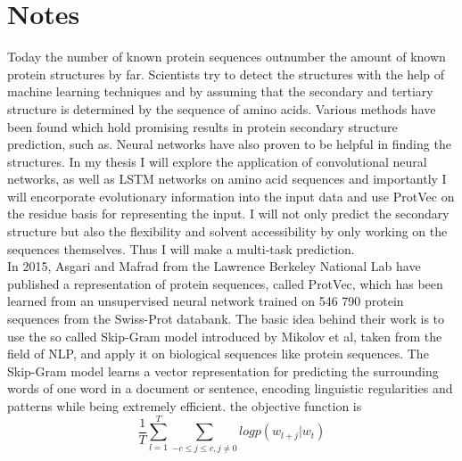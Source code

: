 \documentclass{article}
\begin{document}
\section{Notes}

Today the number of known protein sequences outnumber the amount of known protein structures by far. Scientists try to detect the structures with the help of machine learning techniques and by assuming that the secondary and tertiary structure is determined by the sequence of amino acids. Various methods have been found which hold promising results in protein secondary structure prediction, such as. Neural networks have also proven to be helpful in finding the structures.
In my thesis I will explore the application of convolutional neural networks, as well as LSTM networks on amino acid sequences and importantly I will encorporate evolutionary information into the input data and use ProtVec on the residue basis for representing the input. I will not only predict the secondary structure but also the flexibility and solvent accessibility by only working on the sequences themselves. Thus I will make a multi-task prediction.\\

In 2015, Asgari and Mafrad from the Lawrence Berkeley National Lab have published a representation of protein sequences, called ProtVec, which has been learned from an unsupervised neural network trained on 546 790 protein sequences from the Swiss-Prot databank. The basic idea behind their work is to use the so called Skip-Gram model introduced by Mikolov et al, taken from the field of NLP, and apply it on biological sequences like protein sequences. 
The Skip-Gram model learns a vector representation for predicting the surrounding words of one word in a document or sentence, encoding linguistic regularities and patterns while being extremely efficient. the objective function is 
\begin{equation}
\frac{1}{T}\sum^{T}_{l=1}\sum_{-c\leq j \leq c, j\neq 0} log p(w_{l+j}|w_{t})
\end{equation}
\end{document}
